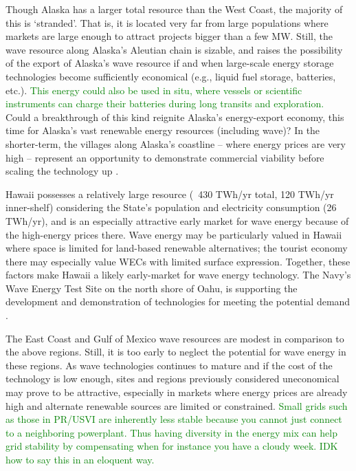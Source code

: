 Though Alaska has a larger total resource than the West Coast, the majority of this is `stranded'. That is, it is located very far from large populations where markets are large enough to attract projects bigger than a few MW. Still, the wave resource along Alaska's Aleutian chain is sizable, and raises the possibility of the export of Alaska's wave resource if and when large-scale energy storage technologies become sufficiently economical (e.g., liquid fuel storage, batteries, etc.). \textcolor{green}{This energy could also be used in situ, where vessels or scientific instruments can charge their batteries during long transits and exploration.} Could a breakthrough of this kind reignite Alaska's energy-export economy, this time for Alaska's vast renewable energy resources (including wave)? In the shorter-term, the villages along Alaska's coastline -- where energy prices are very high -- represent an opportunity to demonstrate commercial viability before scaling the technology up \cite{alaskaenergyauthority2019PowerCost2020}.

Hawaii possesses a relatively large resource (~430 TWh/yr total, 120 TWh/yr inner-shelf) considering the State's population and electricity consumption (26 TWh/yr), and is an especially attractive early market for wave energy because of the high-energy prices there. 
Wave energy may be particularly valued in Hawaii where space is limited for land-based renewable alternatives; the tourist economy there may especially value WECs with limited surface expression. Together, these factors make Hawaii a likely early-market for wave energy technology. The Navy's Wave Energy Test Site on the north shore of Oahu, is supporting the development and demonstration of technologies for meeting the potential demand \citep{crossEarlyResearchEfforts2015}.

The East Coast and Gulf of Mexico wave resources are modest in comparison to the above regions. Still, it is too early to neglect the potential for wave energy in these regions. As wave technologies continues to mature and if the cost of the technology is low enough, sites and regions previously considered uneconomical may prove to be attractive, especially in markets where energy prices are already high and alternate renewable sources are limited or constrained. \textcolor{green}{Small grids such as those in PR/USVI are inherently less stable because you cannot just connect to a neighboring powerplant. Thus  having diversity in the energy mix can help grid stability by compensating when for instance you have a cloudy week. IDK how to say this in an eloquent way.}

